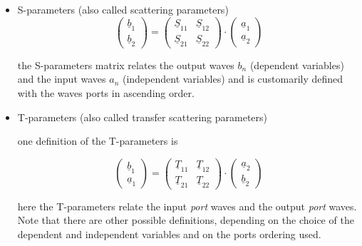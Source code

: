 \begin{itemize}

\item S-parameters (also called scattering parameters)
\begin{equation}
\label{eq:sparamdef}
\begin{pmatrix}
\underline{b}_{1}\\
\underline{b}_{2}
\end{pmatrix}
=
\begin{pmatrix}
\underline{S}_{11} & \underline{S}_{12}\\
\underline{S}_{21} & \underline{S}_{22}
\end{pmatrix}
\cdot
\begin{pmatrix}
\underline{a}_{1}\\
\underline{a}_{2}
\end{pmatrix}
\end{equation}

the S-parameters matrix relates the output waves ${b}_{n}$ (dependent variables) and the input waves ${a}_{n}$ (independent variables) and is customarily defined with the waves ports in ascending order.

\item T-parameters (also called transfer scattering parameters)

one definition of the T-parameters is

\begin{equation}
\label{eq:tparamdef}
\begin{pmatrix}
\underline{b}_{1}\\
\underline{a}_{1}
\end{pmatrix}
=
\begin{pmatrix}
\underline{T}_{11} & \underline{T}_{12}\\
\underline{T}_{21} & \underline{T}_{22}
\end{pmatrix}
\cdot
\begin{pmatrix}
\underline{a}_{2}\\
\underline{b}_{2}
\end{pmatrix}
\end{equation}

here the T-parameters relate the input \textit{port} waves and the output \textit{port} waves. Note that there are other possible definitions, depending on the choice of the dependent and independent variables and on the ports ordering used.

\end{itemize}

